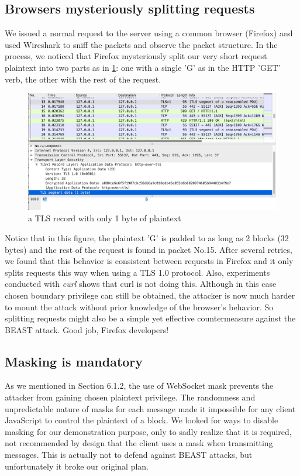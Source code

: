 \documentclass{acm_proc_article-sp}
\begin{document}
\subsection{Browsers mysteriously splitting requests}
We issued a normal request to the server using a common browser (Firefox) and used Wireshark to
sniff the packets and observe the packet structure. In the process, we noticed that Firefox
mysteriously split our very short request plaintext into two parts as in \ref{fig:split}:
one with a single 'G' as in the HTTP 'GET' verb, the other with the rest of the request.

\begin{figure}[htb]
    \centering
    \includegraphics[keepaspectratio, width=\linewidth]{./figures/split.png}
    \caption{a TLS record with only 1 byte of plaintext}
    \label{fig:split}
\end{figure}
Notice that in this figure, the plaintext 'G' is padded to as long as 2 blocks (32 bytes) and the rest of
the request is found in packet No.15.
After several retries, we found that this behavior is consistent between requests in Firefox and it only
splits requests this way when using a TLS 1.0 protocol. Also, experiments conducted with \textit{curl}
shows that curl is not doing this. Although in this case chosen boundary privilege can still be
obtained, the attacker is now much harder to mount the attack without prior knowledge of the
browser's behavior. So splitting requests might also be a simple yet effective countermeasure
against the BEAST attack. Good job, Firefox developers!
\subsection{Masking is mandatory}
As we mentioned in Section 6.1.2, the use of WebSocket mask prevents the attacker from gaining
chosen plaintext privilege. The randomness and unpredictable nature of masks for each message
made it impossible for any client JavaScript to control the plaintext of a block. We looked for ways
to disable masking for our demonstration purpose, only to sadly realize that it is required, not
recommended by design\cite{rfc6455} that the client uses a mask when transmitting messages.
This is actually not to defend against BEAST attacks, but unfortunately it broke our original plan.
\end{document}
